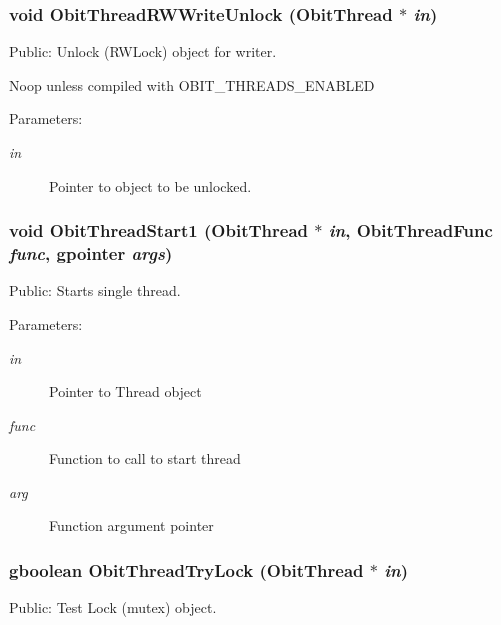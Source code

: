 \subsubsection{\setlength{\rightskip}{0pt plus 5cm}void Obit\-Thread\-RWWrite\-Unlock ({\bf Obit\-Thread} $\ast$ {\em in})}\label{ObitThread_8h_a14}


Public: Unlock (RWLock) object for writer. 

Noop unless compiled with OBIT\_\-THREADS\_\-ENABLED \begin{Desc}
\item[Parameters:]
\begin{description}
\item[{\em in}]Pointer to object to be unlocked. \end{description}
\end{Desc}
\subsubsection{\setlength{\rightskip}{0pt plus 5cm}void Obit\-Thread\-Start1 ({\bf Obit\-Thread} $\ast$ {\em in}, {\bf Obit\-Thread\-Func} {\em func}, gpointer {\em args})}\label{ObitThread_8h_a25}


Public: Starts single thread. 

\begin{Desc}
\item[Parameters:]
\begin{description}
\item[{\em in}]Pointer to Thread object \item[{\em func}]Function to call to start thread \item[{\em arg}]Function argument pointer \end{description}
\end{Desc}
\subsubsection{\setlength{\rightskip}{0pt plus 5cm}gboolean Obit\-Thread\-Try\-Lock ({\bf Obit\-Thread} $\ast$ {\em in})}\label{ObitThread_8h_a7}


Public: Test Lock (mutex) object. 

